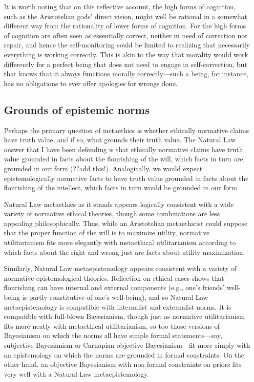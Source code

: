 It is worth noting that on this reflective account, the high forms of cognition, such as the 
Aristotelian gods' direct vision, might well be rational in a somewhat different way from the rationality 
of lower forms of cognition. For the high forms of cognition 
are often seen as essentially correct, neither in need of correction nor repair, and hence the 
self-monitoring could be limited to realizing that necessarily everything is working correctly. 
This is akin to the way that morality would work differently for a perfect being that does not need 
to engage in self-correction, but that knows that it always functions morally correctly---such a being,
for instance, has no obligations to ever offer apologies for wrongs done. 

\subsection{Grounds of epistemic norms}
Perhaps the primary question of metaethics is whether ethically normative claims have truth value, and if so, what grounds their truth value.
The Natural Law answer that I have been defending is that ethically normative claims have truth value grounded in facts about the 
flourishing of the will, which facts in turn are grounded in our form (??add this!). Analogically, we would expect epistemologically 
normative facts to have truth value grounded in facts about the flourishing of the intellect, which facts in turn would be grounded
in our form.

Natural Law metaethics as it stands appears logically consistent with a wide variety of normative ethical theories, though some combinations are
less appealing philosophically. Thus, while an Aristotelian metaethicist could suppose that the proper function of the will is to maximize utility, 
normative utilitarianism fits more elegantly with metaethical utilitarianism according to which facts about the right
and wrong just are facts about utility maximization. 

Similarly, Natural Law metaepistemology appears consistent with a variety of normative epistemological theories. Reflection on ethical cases
shows that flourishing can have internal and external components (e.g., one's friends' well-being is partly constitutive of one's 
well-being), and so Natural Law metaepistemology is compatible with internalist and externalist norms. It is compatible with 
full-blown Bayesianism, though just as normative utilitarianism fits more neatly with metaethical utilitarianism, so too those
versions of Bayesianism on which the norms all have simple formal statements---say, subjective Bayesianism or Carnapian objective
Bayesianism---fit more simply with an epistemology on which the norms are grounded in formal constraints. On the other hand, an
objective Bayesianism with non-formal constraints on priors fits very well with a Natural Law metaepistemology.

